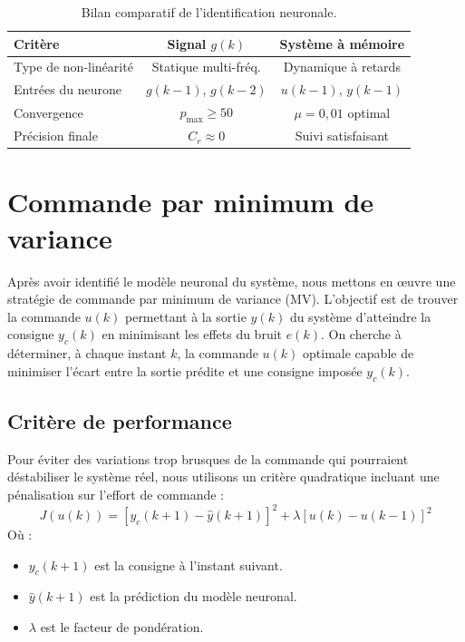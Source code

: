 \begin{table}[H]
	\centering
	\caption{Bilan comparatif de l'identification neuronale.}
	\renewcommand{\arraystretch}{1.3}
	\begin{tabular}{lcc}
		\hline
		\textbf{Critère}       & \textbf{Signal $g(k)$}
		& \textbf{Système à mémoire}    \\
		\hline
		Type de non-linéarité  & Statique multi-fréq.
		& Dynamique à retards            \\
		Entrées du neurone     & $g(k-1)$, $g(k-2)$
		& $u(k-1)$, $y(k-1)$            \\
		Convergence            & $p_{\max} \geq 50$
		& $\mu = 0{,}01$ optimal         \\
		Précision finale       & $C_r \approx 0$
		& Suivi satisfaisant             \\
		\hline
	\end{tabular}
	\label{tab:bilan_neuronal}
\end{table}

\section{Commande par minimum de variance}

Après avoir identifié le modèle neuronal du système, nous mettons en œuvre une stratégie de commande par minimum de variance (MV). L'objectif est de trouver la commande $u(k)$ permettant à la sortie $y(k)$ du système d'atteindre la consigne $y_c(k)$ en minimisant les effets du bruit $e(k)$. On cherche à déterminer, à chaque instant $k$, la commande $u(k)$ optimale capable de minimiser l'écart entre la sortie prédite et une consigne imposée $y_c(k)$.

\subsection{Critère de performance}

Pour éviter des variations trop brusques de la commande qui pourraient déstabiliser le système réel, nous utilisons un critère quadratique incluant une pénalisation sur l'effort de commande :
\begin{equation}
	J(u(k)) = [y_c(k+1) - \hat{y}(k+1)]^2 + \lambda [u(k) - u(k-1)]^2
	\label{eq:critere_mv}
\end{equation}
Où :
\begin{itemize}[label = $\bullet$]
	\item $y_c(k+1)$ est la consigne à l'instant suivant.
	\item $\hat{y}(k+1)$ est la prédiction du modèle neuronal.
	\item $\lambda$ est le facteur de pondération.
\end{itemize}


